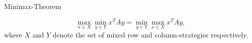 \begin{frame}{Minimax-Theorem}



  \begin{theorem}
  \label{d:thr:7}
  \begin{displaymath}
   \max_{x \in X} \min_{y\in Y} x^TA y = \min_{y\in Y} \max_{x\in X}
   x^TAy,       
  \end{displaymath}
  where $X$ and $Y$ denote the set of mixed row and column-strategies
  respectively. 
\end{theorem}
   \begin{columns}
    \begin{column}{.5\textwidth}
      
    \end{column}
    \begin{column}{.5\textwidth}
      
    \end{column}       
  \end{columns}
\end{frame}


\begin{frame}{}
  
\end{frame}




